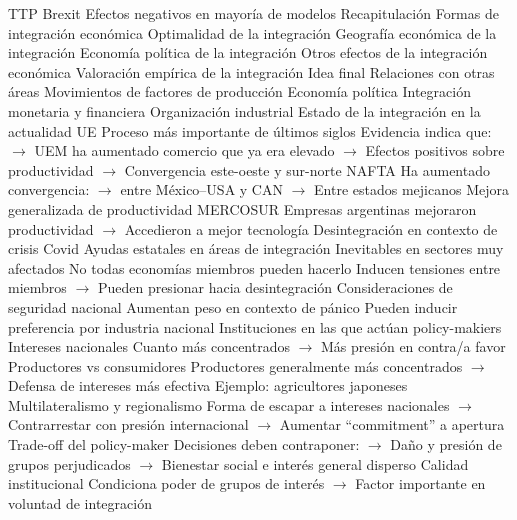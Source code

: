 \documentclass{nuevotema}
\begin{document}
\begin{esquemal}
				\4 TTP
				\4 Brexit
				\4[] Efectos negativos en mayoría de modelos
	\1[] 
		\2 Recapitulación
			\3 Formas de integración económica
			\3 Optimalidad de la integración
			\3 Geografía económica de la integración
			\3 Economía política de la integración
			\3 Otros efectos de la integración económica
			\3 Valoración empírica de la integración
		\2 Idea final
			\3 Relaciones con otras áreas
				\4 Movimientos de factores de producción
				\4 Economía política
				\4 Integración monetaria y financiera
				\4 Organización industrial
			\3 Estado de la integración en la actualidad
				\4 UE
				\4[] Proceso más importante de últimos siglos
				\4[] Evidencia indica que:
				\4[] $\to$ UEM ha aumentado comercio que ya era elevado
				\4[] $\to$ Efectos positivos sobre productividad
				\4[] $\to$ Convergencia este-oeste y sur-norte
				\4 NAFTA
				\4[] Ha aumentado convergencia:
				\4[] $\to$ entre México--USA y CAN
				\4[] $\to$ Entre estados mejicanos
				\4[] Mejora generalizada de productividad
				\4 MERCOSUR
				\4[] Empresas argentinas mejoraron productividad
				\4[] $\to$ Accedieron a mejor tecnología
			\3 Desintegración en contexto de crisis Covid
				\4 Ayudas estatales en áreas de integración
				\4[] Inevitables en sectores muy afectados
				\4[] No todas economías miembros pueden hacerlo
				\4[] Inducen tensiones entre miembros
				\4[] $\to$ Pueden presionar hacia desintegración
				\4 Consideraciones de seguridad nacional
				\4[] Aumentan peso en contexto de pánico
				\4[] Pueden inducir preferencia por industria nacional
			\3 Instituciones en las que actúan policy-makiers
				\4 Intereses nacionales
				\4[] Cuanto más concentrados
				\4[] $\to$ Más presión en contra/a favor
				\4 Productores vs consumidores
				\4[] Productores generalmente más concentrados
				\4[] $\to$ Defensa de intereses más efectiva
				\4[] Ejemplo: agricultores japoneses
				\4 Multilateralismo y regionalismo
				\4[] Forma de escapar a intereses nacionales
				\4[] $\to$ Contrarrestar con presión internacional
				\4[] $\to$ Aumentar ``commitment'' a apertura
				\4 Trade-off del policy-maker
				\4[] Decisiones deben contraponer:
				\4[] $\to$ Daño y presión de grupos perjudicados
				\4[] $\to$ Bienestar social e interés general disperso
				\4 Calidad institucional
				\4[] Condiciona poder de grupos de interés
				\4[] $\to$ Factor importante en voluntad de integración

\end{esquemal}
\end{document}
